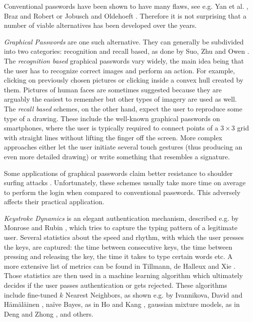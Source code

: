 Conventional passwords have been shown to have many flaws, see e.g. Yan et al. \cite{yan:2004:password}, Braz and Robert \cite{braz:2006:security} or Jobusch and Oldehoeft \cite{jobusch:1989:survey-of-password-mechanisms-1, jobusch:1989:survey-of-password-mechanisms-2}. Therefore it is not surprising that a number of viable alternatives has been developed over the years.

\emph{Graphical Passwords} are one such alternative. They can generally be subdivided into two categories: recognition and recall based, as done by Suo, Zhu and Owen \cite{suo:2005:graphical-passwords-survey}. The \emph{recognition based} graphical passwords vary widely, the main idea being that the user has to recognize correct images and perform an action. For example, clicking on previously chosen pictures or clicking inside a convex hull created by them. Pictures of human faces are sometimes suggested because they are arguably the easiest to remember but other types of imagery are used as well. The \emph{recall based} schemes, on the other hand, expect the user to reproduce some type of a drawing. These include the well-known graphical passwords on smartphones, where the user is typically required to connect points of a \(3 \times 3\) grid with straight lines without lifting the finger off the screen. More complex approaches either let the user initiate several touch gestures (thus producing an even more detailed drawing) or write something that resembles a signature.

Some applications of graphical passwords claim better resistance to shoulder surfing attacks \cite{suo:2005:graphical-passwords-survey}. Unfortunately, these schemes usually take more time on average to perform the login when compared to conventional passwords. This adversely affects their practical application.

\emph{Keystroke Dynamics} is an elegant authentication mechanism, described e.g. by Monrose and Rubin \cite{monrose:2000:keystroke-dynamics}, which tries to capture the typing pattern of a legitimate user. Several statistics about the speed and rhythm, with which the user presses the keys, are captured: the time between consecutive keys, the time between pressing and releasing the key, the time it takes to type certain words etc. A more extensive list of metrics can be found in  Tillmann, de Halleux and Xie \cite{teh:2013:survey-keystroke-biometrics}. Those statistics are then used in a machine learning algorithm which ultimately decides if the user passes authentication or gets rejected. These algorithms include fine-tuned \(k\) Nearest Neighbors, as shown e.g. by Ivannikova, David and Hämäläinen \cite{ivannikova:2017:anomaly-detection-keystroke-dynamics}, naïve Bayes, as in Ho and Kang \cite{ho:2017:onenb}, gaussian mixture models, as in Deng and Zhong \cite{yunbin:2013:gmm-keystroke}, and others.

